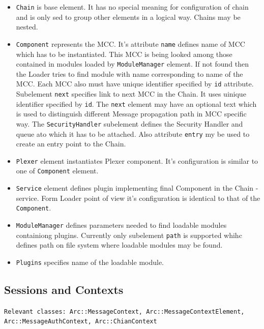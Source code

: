 \documentclass{book}
\begin{document}
\begin{itemize}

\item \texttt{Chain} is base element. It has no special meaning for configuration of chain and is only sed to group other elements in a logical way. Chains may be nested.

\item \texttt{Component} represents the MCC. It's attribute \texttt{name} defines name of MCC which has to be instantiated. This MCC is being looked among those contained in modules loaded by \texttt{ModuleManager} element. If not found then the Loader tries to find module with name corresponding to name of the MCC. Each MCC also must have unique identifier specified by \texttt{id} attribute. Subelement \texttt{next} specifies link to next MCC in the Chain. It uses uinique identifier specified by \texttt{id}. The \texttt{next} element may have an optional text which is used to distinguish different Message propagation path in MCC specific way. The \texttt{SecurityHandler} subelement defines the Security Handler and queue ato which it has to be attached. Also attribute \texttt{entry} my be used to create an entry point to the Chain.

\item \texttt{Plexer} element instantiates Plexer component. It's configuration is similar to one of \texttt{Component} element.

\item \texttt{Service} element defines plugin implementing final Component in the Chain - service. Form Loader point of view it's configuration is identical to that of the \texttt{Component}.

\item \texttt{ModuleManager} defines parameters needed to find loadable modules containiong plugins. Currently only subelement \texttt{path} is supported whihc defines path on file system where loadable modules may be found.

\item \texttt{Plugins} specifies name of the loadable module.

\end{itemize}

\subsection{Sessions and Contexts}

\texttt{Relevant classes: Arc::MessageContext, Arc::MessageContextElement, Arc::MessageAuthContext, Arc::ChianContext }
\end{document}
